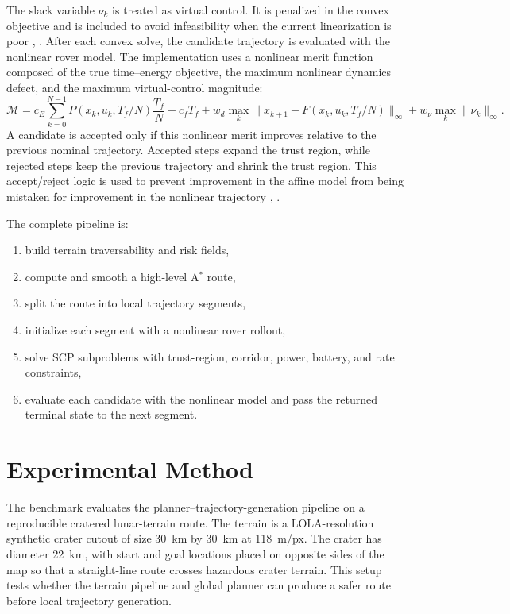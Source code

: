 \documentclass[conf]{new-aiaa}
\begin{document}
The slack variable $\nu_k$ is treated as virtual control. It is penalized in the convex objective and is included to avoid infeasibility when the current linearization is poor  \cite{malyuta2022scvx}, \cite{duchi2018scp}. After each convex solve, the candidate trajectory is evaluated with the nonlinear rover model. The implementation uses a nonlinear merit function composed of the true time--energy objective, the maximum nonlinear dynamics defect, and the maximum virtual-control magnitude:
\begin{equation}
    \mathcal{M}
    =
    c_E\sum_{k=0}^{N-1}P(x_k,u_k,T_f/N)\frac{T_f}{N}
    +c_fT_f
    +w_d\max_k\|x_{k+1}-F(x_k,u_k,T_f/N)\|_\infty
    +w_\nu\max_k\|\nu_k\|_\infty .
\end{equation}
A candidate is accepted only if this nonlinear merit improves relative to the previous nominal trajectory. Accepted steps expand the trust region, while rejected steps keep the previous trajectory and shrink the trust region. This accept/reject logic is used to prevent improvement in the affine model from being mistaken for improvement in the nonlinear trajectory \cite{malyuta2022scvx}, \cite{duchi2018scp}.

The complete pipeline is:
\begin{enumerate}
    \item build terrain traversability and risk fields,
    \item compute and smooth a high-level A$^\ast$ route,
    \item split the route into local trajectory segments,
    \item initialize each segment with a nonlinear rover rollout,
    \item solve SCP subproblems with trust-region, corridor, power, battery, and rate constraints,
    \item evaluate each candidate with the nonlinear model and pass the returned terminal state to the next segment.
\end{enumerate}

\section{Experimental Method}
The benchmark evaluates the planner--trajectory-generation pipeline on a reproducible cratered lunar-terrain route. The terrain is a LOLA-resolution synthetic crater cutout of size \SI{30}{km} by \SI{30}{km} at \SI{118}{m/px}. The crater has diameter \SI{22}{km}, with start and goal locations placed on opposite sides of the map so that a straight-line route crosses hazardous crater terrain. This setup tests whether the terrain pipeline and global planner can produce a safer route before local trajectory generation.
\end{document}
